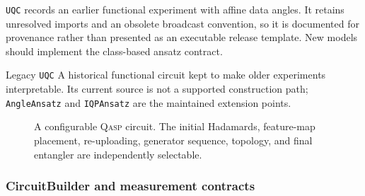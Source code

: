 \documentclass[10pt]{article}
\newcommand{\qasp}{\textsc{Qasp}}
\newcommand{\code}[1]{\texttt{#1}}
\begin{document}
\code{UQC} records an earlier functional experiment with affine data angles.
It retains unresolved imports and an obsolete broadcast convention, so it is
documented for provenance rather than presented as an executable release
template.  New models should implement the class-based ansatz contract.

\begin{qaspfeature}{Legacy \code{UQC}}
A historical functional circuit kept to make older experiments interpretable.
Its current source is not a supported construction path; \code{AngleAnsatz}
and \code{IQPAnsatz} are the maintained extension points.
\end{qaspfeature}

\begin{figure}[t]
\centering
{}
\caption{A configurable \qasp{} circuit.  The initial Hadamards, feature-map placement, re-uploading, generator sequence, topology, and final entangler are independently selectable.}
\label{fig:circuit}
\end{figure}

\subsubsection{CircuitBuilder and measurement contracts}
\end{document}
